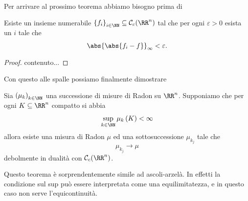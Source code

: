 \documentclass[11pt]{scrartcl}
\begin{document}
	Per arrivare al prossimo teorema abbiamo bisogno prima di 
	\begin{lemma}
		Esiste un insieme numerabile $\left\{f_i\right\}_{i\in\NN}\subseteq \mathcal{C}_c(\RR^n)$ tal che per ogni $\varepsilon>0$ esista un $i$ tale che
		$$\abs{\abs{f_i-f}}_\infty<\varepsilon.$$
	\end{lemma}
	\begin{proof}
		contenuto...
	\end{proof}
	Con questo alle spalle possiamo finalmente dimostrare
	\begin{theorem}
		Sia $\left(\mu_k\right)_{k\in\NN}$ una successione di misure di Radon su $\RR^n$. Supponiamo che per ogni $K\subseteq \RR^n$ compatto si abbia
		$$\sup_{k\in\NN}\mu_k\left(K\right)<\infty$$
		allora esiste una misura di Radon $\mu$ ed una sottosuccessione $\mu_{k_j}$ tale che 
		$$\mu_{k_j}\to \mu$$
		debolmente in dualità con $\mathcal{C}_c(\RR^n)$.
	\end{theorem}
	\begin{remark}
		Questo teorema è sorprendentemente simile ad ascoli-arzelà. In effetti la condizione sul sup può essere interpretata come una equilimitatezza, e in questo caso non serve l'equicontinuità.
	\end{remark}
\end{document}
